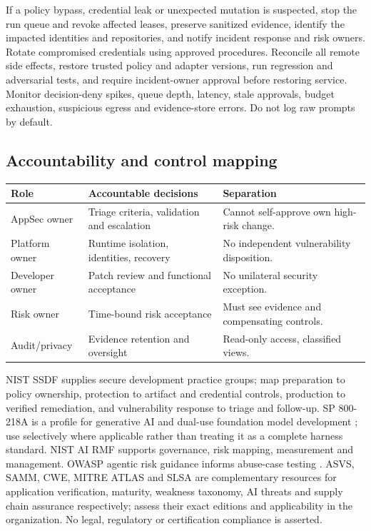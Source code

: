 \documentclass[11pt,letterpaper]{article}
\begin{document}
If a policy bypass, credential leak or unexpected mutation is suspected, stop the run queue and revoke affected leases, preserve sanitized evidence, identify the impacted identities and repositories, and notify incident response and risk owners. Rotate compromised credentials using approved procedures. Reconcile all remote side effects, restore trusted policy and adapter versions, run regression and adversarial tests, and require incident-owner approval before restoring service. Monitor decision-deny spikes, queue depth, latency, stale approvals, budget exhaustion, suspicious egress and evidence-store errors. Do not log raw prompts by default.

\subsection{Accountability and control mapping}
\begin{longtable}{@{}>{\raggedright\arraybackslash}p{.28\linewidth}>{\raggedright\arraybackslash}p{.32\linewidth}>{\raggedright\arraybackslash}p{.32\linewidth}@{}}
\toprule Role & Accountable decisions & Separation\\\midrule\endhead
AppSec owner & Triage criteria, validation and escalation & Cannot self-approve own high-risk change.\\
Platform owner & Runtime isolation, identities, recovery & No independent vulnerability disposition.\\
Developer owner & Patch review and functional acceptance & No unilateral security exception.\\
Risk owner & Time-bound risk acceptance & Must see evidence and compensating controls.\\
Audit/privacy & Evidence retention and oversight & Read-only access, classified views.\\
\bottomrule
\end{longtable}
NIST SSDF \cite{ssdf} supplies secure development practice groups; map preparation to policy ownership, protection to artifact and credential controls, production to verified remediation, and vulnerability response to triage and follow-up. SP 800-218A is a profile for generative AI and dual-use foundation model development \cite{ssdfa}; use selectively where applicable rather than treating it as a complete harness standard. NIST AI RMF \cite{airmf} supports governance, risk mapping, measurement and management. OWASP agentic risk guidance informs abuse-case testing \cite{owasp}. ASVS, SAMM, CWE, MITRE ATLAS and SLSA are complementary resources for application verification, maturity, weakness taxonomy, AI threats and supply chain assurance respectively; assess their exact editions and applicability in the organization. No legal, regulatory or certification compliance is asserted.
\end{document}
